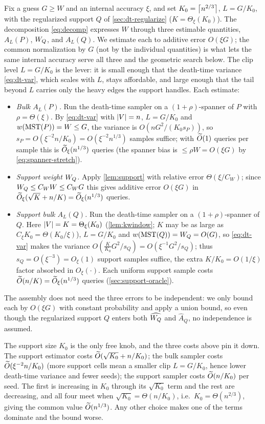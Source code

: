 Fix a guess $G\ge W$ and an internal accuracy $\xi$, and set $K_0=\left\lceil n^{2/3} \right\rceil$, $L=G/K_0$, with the
regularized support $Q$ of \cref{sec:dt-regularize} ($K=\Theta_\xi(K_0)$). The decomposition
\eqref{eq:decomp} expresses $W$ through three estimable quantities, $A_L(P)$, $W_Q$, and $A_L(Q)$. We
estimate each to additive error $O(\xi G)$; the common normalization by $G$ (not by the individual
quantities) is what lets the same internal accuracy serve all three and the geometric search below. The
clip level $L=G/K_0$ is the lever: it is small enough that the death-time variance \eqref{eq:dt-var},
which scales with $L$, stays affordable, and large enough that the tail beyond $L$ carries only the heavy
edges the support handles. Each estimate:
\begin{itemize}[leftmargin=1.5em,itemsep=2pt]
\item \emph{Bulk $A_L(P)$.} Run the death-time sampler on a $(1+\rho)$-spanner of $P$ with
  $\rho=\Theta(\xi)$. By \eqref{eq:dt-var} with $\left|V\right|=n$, $L=G/K_0$ and $w(\mathrm{MST}(P))=W\le G$, the
  variance is $O(nG^2/(K_0 s_P))$, so $s_P=O(\xi^{-2}n/K_0)=O(\xi^{-2}n^{1/3})$ samples suffice; with
  $\widetilde{O}(1)$ queries per sample this is $\widetilde{O}_\xi(n^{1/3})$ queries (the spanner bias is
  $\le\rho W=O(\xi G)$ by \eqref{eq:spanner-stretch}).
\item \emph{Support weight $W_Q$.} Apply \cref{lem:support} with relative error $\Theta(\xi/C_W)$; since
  $W_Q\le C_W W\le C_W G$ this gives additive error $O(\xi G)$ in $\widetilde{O}_\xi(\sqrt K+n/K)=\widetilde{O}_\xi(n^{1/3})$
  queries.
\item \emph{Support bulk $A_L(Q)$.} Run the death-time sampler on a $(1+\rho)$-spanner of $Q$. Here
  $\left|V\right|=K=\Theta_\xi(K_0)$ (\cref{lem:kwindow}; $K$ may be as large as $C_\xi K_0=\Theta(K_0/\xi)$),
  $L=G/K_0$ and $w(\mathrm{MST}(Q))=W_Q=O(G)$, so \eqref{eq:dt-var} makes the variance $O(\tfrac{K}{K_0}G^2/s_Q)
  =O(\xi^{-1}G^2/s_Q)$; thus $s_Q=O(\xi^{-3})=O_\xi(1)$ support samples suffice, the extra $K/K_0=O(1/\xi)$
  factor absorbed in $O_\xi(\cdot)$. Each uniform support sample costs $\widetilde{O}(n/K)=\widetilde{O}_\xi(n^{1/3})$
  queries (\cref{sec:support-oracle}).
\end{itemize}
The assembly does not need the three errors to be independent: we only bound each by $O(\xi G)$ with
constant probability and apply a union bound, so even though the regularized support $Q$ enters both
$\widehat{W_Q}$ and $\widehat A_Q$, no independence is assumed.


\begin{remark}[The choice $K_0=n^{2/3}$]\label{rem:k0}
The support size $K_0$ is the only free knob, and the three costs above pin it down. The support estimator
costs $\widetilde{O}(\sqrt{K_0}+n/K_0)$; the bulk sampler costs $\widetilde{O}(\xi^{-2}n/K_0)$ (more support cells mean a
smaller clip $L=G/K_0$, hence lower death-time variance and fewer seeds); the support sampler costs
$\widetilde{O}(n/K_0)$ per seed. The first is increasing in $K_0$ through its $\sqrt{K_0}$ term and the rest are
decreasing, and all four meet when $\sqrt{K_0}=\Theta(n/K_0)$, i.e.\ $K_0=\Theta(n^{2/3})$, giving the
common value $\widetilde{O}(n^{1/3})$. Any other choice makes one of the terms dominate and the bound worse.
\end{remark}

